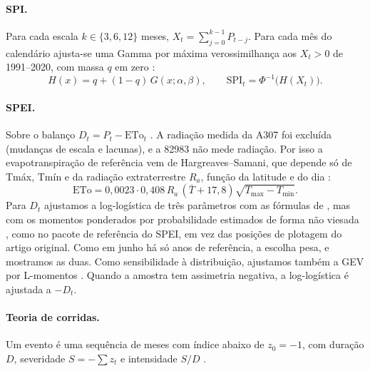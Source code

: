 \documentclass[11pt,a4paper]{article}
\newcommand{\Est}{82983}
\begin{document}
\paragraph{SPI.} Para cada escala $k \in \{3, 6, 12\}$ meses, $X_t = \sum_{j=0}^{k-1} P_{t-j}$.
Para cada mês do calendário ajusta-se uma Gamma por máxima verossimilhança aos $X_t>0$ de
1991--2020, com massa $q$ em zero \parencite{mckee1993,guttman1999}:
\begin{equation}
  H(x) = q + (1-q)\,G(x;\alpha,\beta), \qquad \mathrm{SPI}_t = \Phi^{-1}\!\big(H(X_t)\big).
\end{equation}

\paragraph{SPEI.} Sobre o balanço $D_t = P_t - \mathrm{ETo}_t$ \parencite{vicenteserrano2010}.
A radiação medida da A307 foi excluída (mudanças de escala e lacunas), e a \Est{} não
mede radiação. Por isso a evapotranspiração de referência vem de Hargreaves--Samani, que
depende só de Tmáx, Tmín e da radiação extraterrestre $R_a$, função da latitude e do dia
\parencite{hargreaves1985,allen1998}:
\begin{equation}
  \mathrm{ETo} = 0{,}0023 \cdot 0{,}408\,R_a\,(\bar T + 17{,}8)\sqrt{T_{\max} - T_{\min}}.
\end{equation}
Para $D_t$ ajustamos a log-logística de três parâmetros com as fórmulas de
\textcite{vicenteserrano2010}, mas com os momentos ponderados por probabilidade estimados de forma
não viesada \parencite{hosking1985}, como no pacote de referência do SPEI, em vez das posições de
plotagem do artigo original. Como em junho há só \NRefJunSPEI{} anos de referência, a escolha pesa, e
mostramos as duas. Como sensibilidade à distribuição, ajustamos também a GEV por L-momentos
\parencite{hosking1990,stagge2015}. Quando a amostra tem assimetria negativa, a
log-logística é ajustada a $-D_t$.

\paragraph{Teoria de corridas.} Um evento é uma sequência de meses com índice abaixo de
$z_0=-1$, com duração $D$, severidade $S=-\sum z_t$ e intensidade $S/D$
\parencite{yevjevich1967}.
\end{document}
